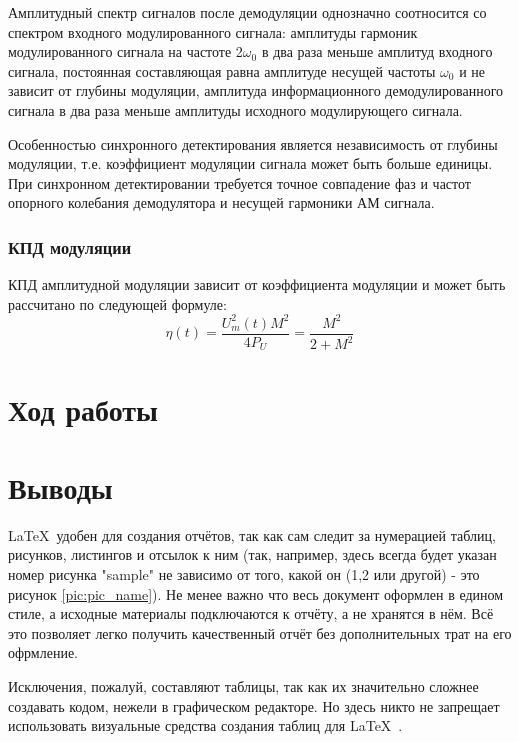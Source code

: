 Амплитудный спектр сигналов после демодуляции однозначно соотносится со спектром входного модулированного сигнала: 
амплитуды гармоник модулированного сигнала на частоте 2$\omega_0$ в два раза меньше амплитуд входного сигнала,
 постоянная составляющая равна амплитуде несущей частоты $\omega_0$ и не зависит от глубины модуляции, амплитуда
  информационного демодулированного сигнала в два раза меньше амплитуды исходного модулирующего сигнала. 

Особенностью синхронного детектирования является независимость от глубины модуляции,
 т.е. коэффициент модуляции сигнала может быть больше единицы. 
 При синхронном детектировании требуется точное совпадение фаз и частот 
 опорного колебания демодулятора и несущей гармоники АМ сигнала.

\subsubsection{КПД модуляции}
КПД амплитудной модуляции зависит от коэффициента модуляции и может быть рассчитано по следующей формуле:
 \begin{equation}\label{eq05}
	\eta (t) =\frac{ U_m^2(t) M^2}{4 P_U}  = \frac{M^2}{2 + M^2} 
\end{equation}


\section{Ход работы}




\section{Выводы}
\LaTeX\ удобен для создания отчётов, так как сам следит за нумерацией таблиц, рисунков, листингов и отсылок к ним (так, например, здесь всегда будет указан номер рисунка "sample" не зависимо от того, какой он (1,2 или другой) - это рисунок \ref{pic:pic_name}). Не менее важно что весь документ оформлен в едином стиле, а исходные материалы подключаются к отчёту, а не хранятся в нём. Всё это позволяет легко получить качественный отчёт без дополнительных трат на его офрмление.

Исключения, пожалуй, составляют таблицы, так как их значительно сложнее создавать кодом, нежели в графическом редакторе. Но здесь никто не запрещает использовать визуальные средства создания таблиц для \LaTeX\ .

